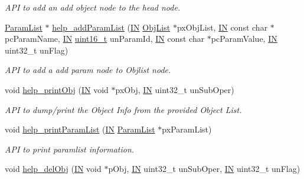 \begin{DoxyCompactItemize}
\begin{DoxyCompactList}\small\item\em A\-P\-I to add an add object node to the head node. \end{DoxyCompactList}\item 
\hyperlink{structParamList}{Param\-List} $\ast$ \hyperlink{group__LIBHELP_gac142687a39a89012a10c29f9e1955169}{help\-\_\-add\-Param\-List} (\hyperlink{group__LIBHELP_gac2bbd6d630a06a980d9a92ddb9a49928}{I\-N} \hyperlink{structObjList}{Obj\-List} $\ast$px\-Obj\-List, \hyperlink{group__LIBHELP_gac2bbd6d630a06a980d9a92ddb9a49928}{I\-N} const char $\ast$pc\-Param\-Name, \hyperlink{group__LIBHELP_gac2bbd6d630a06a980d9a92ddb9a49928}{I\-N} \hyperlink{commondefs_8h_adf4d876453337156dde61095e1f20223}{uint16\-\_\-t} un\-Param\-Id, \hyperlink{group__LIBHELP_gac2bbd6d630a06a980d9a92ddb9a49928}{I\-N} const char $\ast$pc\-Param\-Value, \hyperlink{group__LIBHELP_gac2bbd6d630a06a980d9a92ddb9a49928}{I\-N} uint32\-\_\-t un\-Flag)
\begin{DoxyCompactList}\small\item\em A\-P\-I to add a add param node to Objlist node. \end{DoxyCompactList}\item 
void \hyperlink{group__LIBHELP_gadc95c1908c5d73d1eff54c4223736427}{help\-\_\-print\-Obj} (\hyperlink{group__LIBHELP_gac2bbd6d630a06a980d9a92ddb9a49928}{I\-N} void $\ast$px\-Obj, \hyperlink{group__LIBHELP_gac2bbd6d630a06a980d9a92ddb9a49928}{I\-N} uint32\-\_\-t un\-Sub\-Oper)
\begin{DoxyCompactList}\small\item\em A\-P\-I to dump/print the Object Info from the provided Object List. \end{DoxyCompactList}\item 
void \hyperlink{group__LIBHELP_ga38541ee26cfdda5a69f955fb9ebb1e1e}{help\-\_\-print\-Param\-List} (\hyperlink{group__LIBHELP_gac2bbd6d630a06a980d9a92ddb9a49928}{I\-N} \hyperlink{structParamList}{Param\-List} $\ast$px\-Param\-List)
\begin{DoxyCompactList}\small\item\em A\-P\-I to print paramlist information. \end{DoxyCompactList}\item 
void \hyperlink{group__LIBHELP_gad71c865fd4e0cd7693c46eb1f299be3e}{help\-\_\-del\-Obj} (\hyperlink{group__LIBHELP_gac2bbd6d630a06a980d9a92ddb9a49928}{I\-N} void $\ast$p\-Obj, \hyperlink{group__LIBHELP_gac2bbd6d630a06a980d9a92ddb9a49928}{I\-N} uint32\-\_\-t un\-Sub\-Oper, \hyperlink{group__LIBHELP_gac2bbd6d630a06a980d9a92ddb9a49928}{I\-N} uint32\-\_\-t un\-Flag)

\end{DoxyCompactItemize}
